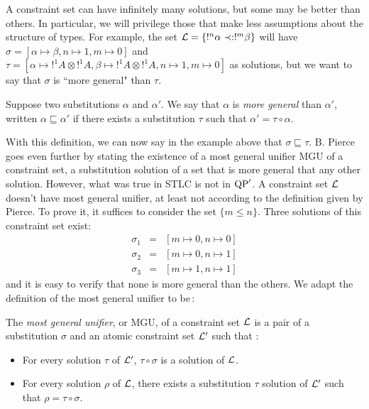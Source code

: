 A constraint set can have infinitely many solutions, but some may be better than others. In particular, we will privilege those
that make less assumptions about the structure of types. For example, the set $\mathcal{L} = \{!^n \alpha \prec: !^m \beta\}$ will have
$\sigma = [\alpha \mapsto \beta, n \mapsto 1, m \mapsto 0]$ and $\tau = [\alpha \mapsto !^1 A \otimes !^1 A, \beta \mapsto !^1 A \otimes !^1 A,
n \mapsto 1, m \mapsto 0]$ as solutions, but we want to say that $\sigma$ is ``more general" than $\tau$.

\begin{defn} Suppose two substitutions $\alpha$ and $\alpha'$. We say that $\alpha$ is \textit{more general} than $\alpha'$, written
	$\alpha \sqsubseteq \alpha'$ if there exists a substitution $\tau$ such that $\alpha' = \tau \circ \alpha$.
\end{defn}

With this definition, we can now say in the example above that $\sigma \sqsubseteq \tau$. B. Pierce goes even further by stating the existence
of a most general unifier MGU of a constraint set, a substitution solution of a set that is more general that any other solution. However,
what was true in STLC is not in ${\rm QP}'$. A constraint set $\mathcal{L}$ doesn't have  most general unifier, at least not according to the definition given
by Pierce. To prove it, it suffices to consider the set $\{ m \le n \}$. Three solutions of this constraint set exist:
	$$ \begin{array}{ccl}
		   \sigma_1 & = & [m \mapsto 0, n \mapsto 0] \\
			 \sigma_2 & = & [m \mapsto 0, n \mapsto 1] \\
			 \sigma_3 & = & [m \mapsto 1, n \mapsto 1]
			\end{array} $$
and it is easy to verify that none is more general than the others.
We adapt the definition of the most general unifier to be\,:

\begin{defn} The \textit{most general unifier}, or MGU, of a constraint set $\mathcal{L}$ is a pair of a substitution $\sigma$ and an atomic
	constraint set $\mathcal{L}'$ such that :
		\begin{itemize}
			\item For every solution $\tau$ of $\mathcal{L}	'$, $\tau \circ \sigma$ is a solution of $\mathcal{L}$.
			\item For every solution $\rho$ of $\mathcal{L}$, there exists a substitution $\tau$ solution of $\mathcal{L}'$ such that $\rho = \tau \circ \sigma$.
		\end{itemize}
\end{defn}

